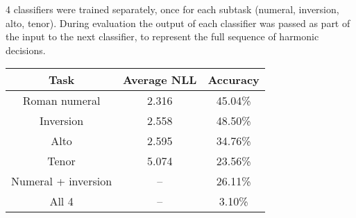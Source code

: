 \documentclass[12pt]{article}
\begin{document}
4 classifiers were trained separately, once for each subtask (numeral, inversion, alto, tenor). During evaluation the output of each classifier was passed as part of the input to the next classifier, to represent the full sequence of harmonic decisions.

\begin{center}
	\begin{tabular}{ c | c | c }
		\textbf{Task} & \textbf{Average NLL} & \textbf{Accuracy} \\ \hline
		Roman numeral & 2.316 & 45.04\% \\ \hline
		Inversion & 2.558 & 48.50\% \\ \hline
		Alto & 2.595 & 34.76\% \\ \hline
		Tenor & 5.074 & 23.56\% \\ \hline
		Numeral + inversion & -- & 26.11\% \\ \hline
		All 4 & -- & 3.10\%
	\end{tabular}
\end{center}
\end{document}
